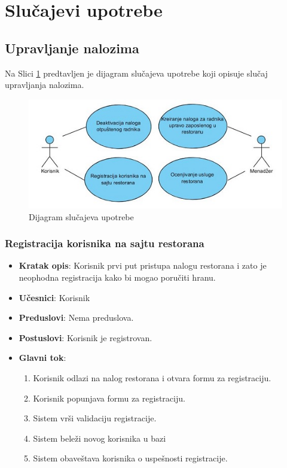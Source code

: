 \newpage
\section{Slu\v cajevi upotrebe}
\subsection{Upravljanje nalozima}

Na Slici \ref{fig:slika9} predtavljen je dijagram slučajeva upotrebe koji opisuje slučaj upravljanja nalozima.

\newpage

\begin{figure}[ht]
    \leavevmode
    \begin{center}
    \includegraphics[width=1\textwidth]{slike/Upravljanje_nalozima.JPG}
    \end{center}
    \caption{Dijagram slučajeva upotrebe}
    \label{fig:slika9}
\end{figure}


\subsubsection{Registracija korisnika na sajtu restorana}
\begin{itemize}
    \item \textbf{Kratak opis}:
    Korisnik prvi put pristupa nalogu restorana i zato je neophodna registracija kako bi mogao poručiti hranu.
    \item \textbf{Učesnici}:
    Korisnik
    \item \textbf{Preduslovi}:
    Nema preduslova. 
    \item \textbf{Postuslovi}:
    Korisnik je registrovan. 
    \item \textbf{Glavni tok}:
    \begin{enumerate}
        \item Korisnik odlazi na nalog restorana i otvara formu za registraciju.
        \item Korisnik popunjava formu za registraciju.
        \item Sistem vrši validaciju registracije.
        \item Sistem beleži novog korisnika u bazi
        \item Sistem obaveštava korisnika o uspešnosti registracije.
    \end{enumerate}
\end{itemize}

